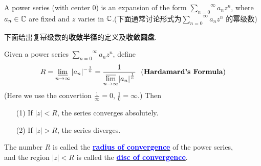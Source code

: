 	\vspace{2em}
	A power series (with center 0) is an expansion of the form $\overset{\infty}{\underset{n = 0}{\sum}}{a_n z^n}$, where $a_n \in \mathbb{C}$ are fixed and $z$ varies in $\mathbb{C}$.(下面通常讨论形式为$\overset{\infty}{\underset{n = 0}{\sum}}{a_n z^n}$ 的幂级数)
	
	\vspace{2em}
	下面给出复幂级数的\textbf{收敛半径}的定义及\textbf{收敛圆盘}.
	\begin{thm}\label{thm 3.1.1}
		Given a power series $\overset{\infty}{\underset{n = 0}{\sum}}{a_n z^n}$, define
		\begin{align}
			R = \varliminf_{n \to \infty}{\left| a_n \right|^{-\frac{1}{n}}} = \frac{1}{\underset{n \to \infty}{\varlimsup}{\left| a_n \right|^{\frac{1}{n}}}} 
			\,\,\,\, (\textbf{Hardamard's Formula})
		\end{align}
		(Here we use the convertion $\frac{1}{\infty} = 0$, $\frac{1}{0} = \infty$.) Then
		\begin{enumerate}
			\item[(1)]If $\left| z \right| < R$, the series converges absolutely.
			
			\item[(2)]If $\left| z \right| > R$, the series diverges.
		\end{enumerate}
	
		\begin{rmk}
			The number $R$ is called the \underline{\textcolor{blue}{\textbf{radius of convergence}}} of the power series, \\
			and the region $\left| z \right| < R$ is called the \underline{\textcolor{blue}{\textbf{disc of convergence}}}.
		\end{rmk}
	\end{thm}

